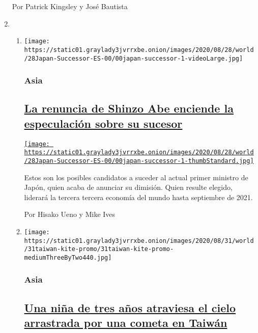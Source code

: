 \begin{enumerate}
  Por Patrick Kingsley y José Bautista
\item
  \begin{enumerate}
  \def\labelenumii{\arabic{enumii}.}
  \item
    \texttt{[image: https://static01.graylady3jvrrxbe.onion/images/2020/08/28/world/28Japan-Successor-ES-00/00japan-successor-1-videoLarge.jpg]}

    \hypertarget{asia}{%
    \subsubsection{Asia}\label{asia}}

    \hypertarget{la-renuncia-de-shinzo-abe-enciende-la-especulaciuxf3n-sobre-su-sucesor}{%
    \subsection{\texorpdfstring{\href{/es/2020/08/29/espanol/mundo/shinzo-abe-sucesor-japon.html}{La
    renuncia de Shinzo Abe enciende la especulación sobre su
    sucesor}}{La renuncia de Shinzo Abe enciende la especulación sobre su sucesor}}\label{la-renuncia-de-shinzo-abe-enciende-la-especulaciuxf3n-sobre-su-sucesor}}

    \href{/es/2020/08/29/espanol/mundo/shinzo-abe-sucesor-japon.html}{\texttt{[image: https://static01.graylady3jvrrxbe.onion/images/2020/08/28/world/28Japan-Successor-ES-00/00japan-successor-1-thumbStandard.jpg]}}

    Estos son los posibles candidatos a suceder al actual primer
    ministro de Japón, quien acaba de anunciar su dimisión. Quien
    resulte elegido, liderará la tercera tercera economía del mundo
    hasta septiembre de 2021.

    Por Hisako Ueno y Mike Ives
  \item
    \texttt{[image: https://static01.graylady3jvrrxbe.onion/images/2020/08/31/world/31taiwan-kite-promo/31taiwan-kite-promo-mediumThreeByTwo440.jpg]}

    \hypertarget{asia-1}{%
    \subsubsection{Asia}\label{asia-1}}

    \hypertarget{una-niuxf1a-de-tres-auxf1os-atraviesa-el-cielo-arrastrada-por-una-cometa-en-taiwuxe1n}{%
    \subsection{\texorpdfstring{\href{/es/2020/08/31/espanol/mundo/nina-cometa-taiwan.html}{Una
    niña de tres años atraviesa el cielo arrastrada por una cometa en
    Taiwán}}{Una niña de tres años atraviesa el cielo arrastrada por una cometa en Taiwán}}\label{una-niuxf1a-de-tres-auxf1os-atraviesa-el-cielo-arrastrada-por-una-cometa-en-taiwuxe1n}}


\end{enumerate}
\end{enumerate}

